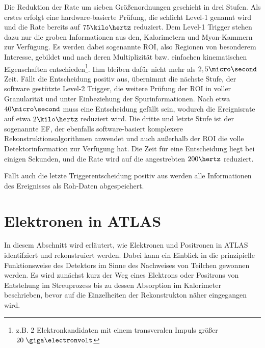 Die Reduktion der Rate um sieben Größenordnungen geschieht in drei Stufen.
Als erstes erfolgt eine hardware-basierte Prüfung, die schlicht Level-1 genannt
wird und die Rate bereits auf $75\kilo\hertz$ reduziert. Dem Level-1 Trigger
stehen dazu nur die groben Informationen aus den, Kalorimetern und Myon-Kammern
zur Verfügung. Es werden dabei sogenannte \acf{ROI}, also Regionen von
besonderem Interesse, gebildet und nach deren Multiplizität bzw. einfachen
kinematischen Eigenschaften entschieden\footnote{z.B. 2 Elektronkandidaten mit
einem transveralen Impuls größer $20\GeV$}. Ihm bleiben dafür nicht mehr als
$2,5\micro\second$ Zeit. Fällt die Entscheidung positiv aus, übernimmt die
nächste Stufe, der software gestützte Level-2 Trigger, die weitere Prüfung der
\ac{ROI} in voller Granularität und unter Einbeziehung der Spurinformationen.
Nach etwa $40\micro\second$ muss eine Entscheidung gefällt sein, wodurch die
Ereignisrate auf etwa $2\kilo\hertz$ reduziert wird. Die dritte und letzte
Stufe ist der sogenannte \acf{EF}, der ebenfalls software-basiert komplexere
Rekonstruktionsalgorithmen anwendet und auch außerhalb der \ac{ROI} die volle
Detektorinformation zur Verfügung hat. Die Zeit für eine Entscheidung liegt bei
einigen Sekunden, und die Rate wird auf die angestrebten $200\hertz$ reduziert.

Fällt auch die letzte Triggerentscheidung positiv aus werden alle Informationen
des Ereignisses als Roh-Daten abgespeichert.


\pagebreak


%
\section{Elektronen in ATLAS}
\label{electrons}

In diesem Abschnitt wird erläutert, wie Elektronen und Positronen in ATLAS
identifziert und rekonstruiert werden. Dabei kann ein Einblick in die
prinzipielle Funktionsweise des Detektors im Sinne des Nachweises von Teilchen
gewonnen werden. Es wird zunächst kurz der Weg eines Elektrons oder Positrons
von Entstehung im Streuprozess bis zu dessen Absorption im Kalorimeter
beschrieben, bevor auf die Einzelheiten der Rekonstrukton näher eingegangen
wird.

